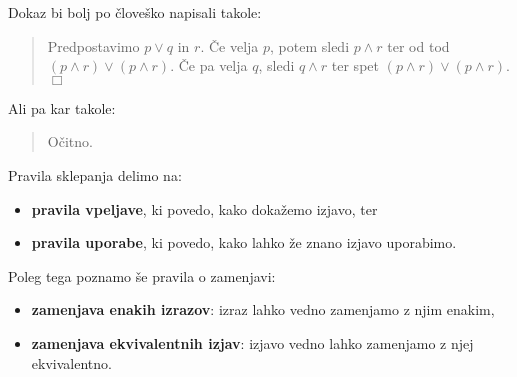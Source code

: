 \begin{center}
\end{center}
%
Dokaz bi bolj po človeško napisali takole:
%
\begin{quote}
  Predpostavimo $p \lor q$ in $r$. Če velja $p$, potem sledi $p \land r$ ter od tod $(p \land r) \lor (p \land r)$. Če pa velja $q$, sledi $q \land r$ ter spet $(p \land r) \lor (p \land r)$. $\Box$
\end{quote}
%
Ali pa kar takole:
%
\begin{quote}
  Očitno.
\end{quote}

Pravila sklepanja delimo na:
%
\begin{itemize}
\item \textbf{pravila vpeljave}, ki povedo, kako dokažemo izjavo, ter
\item \textbf{pravila uporabe}, ki povedo, kako lahko že znano izjavo uporabimo.
\end{itemize}
%
Poleg tega poznamo še pravila o zamenjavi:
%
\begin{itemize}
\item \textbf{zamenjava enakih izrazov}: izraz lahko vedno zamenjamo z njim enakim,
\item \textbf{zamenjava ekvivalentnih izjav}: izjavo vedno lahko zamenjamo z njej ekvivalentno.
\end{itemize}

